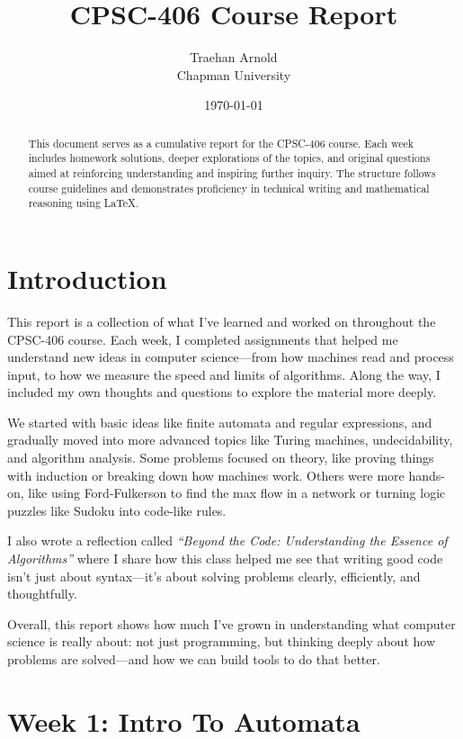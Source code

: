 \documentclass[11pt]{article}
\title{CPSC-406 Course Report}
\author{Traehan Arnold \\ Chapman University}
\date{\today}
\begin{document}
\maketitle

\begin{abstract}
This document serves as a cumulative report for the CPSC-406 course. Each week includes homework solutions, deeper explorations of the topics, and original questions aimed at reinforcing understanding and inspiring further inquiry. The structure follows course guidelines and demonstrates proficiency in technical writing and mathematical reasoning using \LaTeX.
\end{abstract}

\tableofcontents
\newpage

\section{Introduction}

This report is a collection of what I’ve learned and worked on throughout the CPSC-406 course. Each week, I completed assignments that helped me understand new ideas in computer science—from how machines read and process input, to how we measure the speed and limits of algorithms. Along the way, I included my own thoughts and questions to explore the material more deeply.

We started with basic ideas like finite automata and regular expressions, and gradually moved into more advanced topics like Turing machines, undecidability, and algorithm analysis. Some problems focused on theory, like proving things with induction or breaking down how machines work. Others were more hands-on, like using Ford-Fulkerson to find the max flow in a network or turning logic puzzles like Sudoku into code-like rules.

I also wrote a reflection called \textit{“Beyond the Code: Understanding the Essence of Algorithms”} where I share how this class helped me see that writing good code isn’t just about syntax—it’s about solving problems clearly, efficiently, and thoughtfully.

Overall, this report shows how much I’ve grown in understanding what computer science is really about: not just programming, but thinking deeply about how problems are solved—and how we can build tools to do that better.


\section{Week 1: Intro To Automata}
\end{document}
